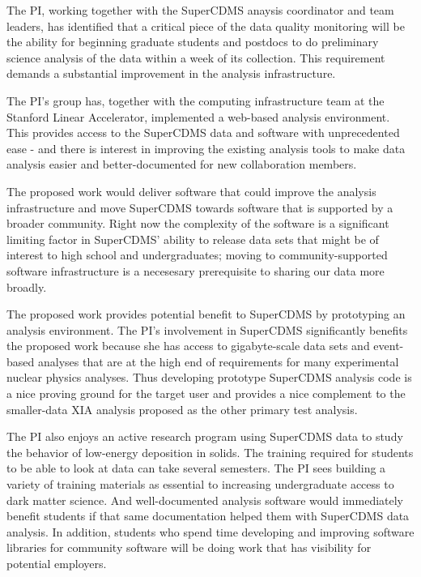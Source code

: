 The PI, working together with the SuperCDMS anaysis coordinator and team leaders, has identified that a critical piece of the data quality monitoring will be the ability for beginning graduate students and postdocs to do preliminary science analysis of the data within a week of its collection.  This requirement demands a substantial improvement in the analysis infrastructure.

The PI's group has, together with the computing infrastructure team at the Stanford Linear Accelerator, implemented a web-based analysis environment.  This provides access to the SuperCDMS data and software with unprecedented ease - and there is interest in improving the existing analysis tools to make data analysis easier and better-documented for new collaboration members. 

The proposed work would deliver software that could improve the analysis infrastructure and move SuperCDMS towards software that is supported by a broader community.  Right now the complexity of the software is a significant limiting factor in SuperCDMS' ability to release data sets that might be of interest to high school and undergraduates; moving to community-supported software infrastructure is a necesesary prerequisite to sharing our data more broadly.

The proposed work provides potential benefit to SuperCDMS by prototyping an analysis environment.  The PI's involvement in SuperCDMS significantly benefits the proposed work because she has access to gigabyte-scale data sets and event-based analyses that are at the high end of requirements for many experimental nuclear physics analyses.  Thus developing prototype SuperCDMS analysis code is a nice proving ground for the target user and provides a nice complement to the smaller-data XIA analysis proposed as the other primary test analysis.

The PI also enjoys an active research program using SuperCDMS data to study the behavior of low-energy deposition in solids.  The training required for students to be able to look at data can take several semesters.  The PI sees building a variety of training materials as essential to increasing undergraduate access to dark matter science.  And well-documented analysis software would immediately benefit students if that same documentation helped them with SuperCDMS data analysis.  In addition, students who spend time developing and improving software libraries for community software will be doing work that has visibility for potential employers.


